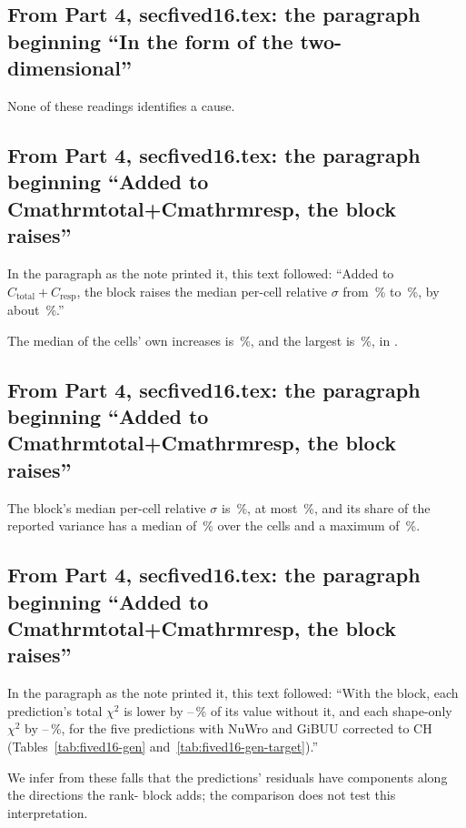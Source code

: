 \subsection{From Part 4, secfived16.tex: the paragraph beginning ``In the form of the two-dimensional''}
None of these readings identifies a cause.

\subsection{From Part 4, secfived16.tex: the paragraph beginning ``Added to Cmathrmtotal+Cmathrmresp, the block raises''}
In the paragraph as the note printed it, this text followed: ``Added to $C_{\mathrm{total}}+C_{\mathrm{resp}}$, the block raises the median per-cell relative $\sigma$ from \,\% to \,\%, by about \,\%.''\par
The median of the cells' own increases is \,\%, and the largest is \,\%, in .

\subsection{From Part 4, secfived16.tex: the paragraph beginning ``Added to Cmathrmtotal+Cmathrmresp, the block raises''}
The block's median per-cell relative $\sigma$ is \,\%, at most \,\%, and its share of the reported variance has a median of \,\% over the cells and a maximum of \,\%.

\subsection{From Part 4, secfived16.tex: the paragraph beginning ``Added to Cmathrmtotal+Cmathrmresp, the block raises''}
In the paragraph as the note printed it, this text followed: ``With the block, each prediction's total $\chi^2$ is lower by --\,\% of its value without it, and each shape-only $\chi^2$ by --\,\%, for the five predictions with NuWro and GiBUU corrected to CH (Tables~\ref{tab:fived16-gen} and~\ref{tab:fived16-gen-target}).''\par
We infer from these falls that the predictions' residuals have components along the directions the rank- block adds; the comparison does not test this interpretation.


